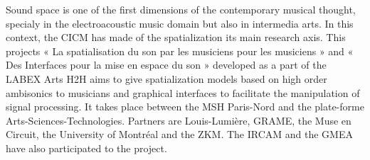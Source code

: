 Sound space is one of the first dimensions of the contemporary musical thought, specialy in the electroacoustic music domain but also in intermedia arts. In this context, the C\-I\-C\-M has made of the spatialization its main research axis. This projects « La spatialisation du son par les musiciens pour les musiciens » and « Des Interfaces pour la mise en espace du son » developed as a part of the L\-A\-B\-E\-X Arts H2\-H aims to give spatialization models based on high order ambisonics to musicians and graphical interfaces to facilitate the manipulation of signal processing. It takes place between the M\-S\-H Paris-\/\-Nord and the plate-\/forme Arts-\/\-Sciences-\/\-Technologies. Partners are Louis-\/\-Lumière, G\-R\-A\-M\-E, the Muse en Circuit, the University of Montréal and the Z\-K\-M. The I\-R\-C\-A\-M and the G\-M\-E\-A have also participated to the project. 